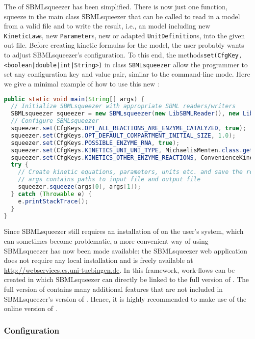 The \API of SBMLsqueezer has been simplified.
There is now just one function, squeeze in the main class SBMLsqueezer that can
be called to read in a model from a valid \SBML file and to write the result,
i.e., an \SBML model including new \texttt{KineticLaw}s, new \texttt{Parameter}s, new or adapted
\texttt{UnitDefinition}s, into the given out file. Before creating kinetic formulas for
the model, the user probably wants to adjust SBMLsqueezer's configuration.
To this end, the methods\texttt{set(CfgKey, <boolean|double|int|String>)} in class
\texttt{SBMLsqueezer} allow the programmer to set any configuration key and value pair,
similar to the command-line mode. Here we give a minimal example of how to use
this new \API:
\begin{lstlisting}[language=Java, caption={Usage of SBMLsqueezer 1.3 via its \acs{API}}, label={lst:1.3APIUsage}]
public static void main(String[] args) {
  // Initialize SBMLsqueezer with appropriate SBML readers/writers
  SBMLsqueezer squeezer = new SBMLsqueezer(new LibSBMLReader(), new LibSBMLWriter());
  // Configure SBMLsqueezer
  squeezer.set(CfgKeys.OPT_ALL_REACTIONS_ARE_ENZYME_CATALYZED, true);
  squeezer.set(CfgKeys.OPT_DEFAULT_COMPARTMENT_INITIAL_SIZE, 1.0);
  squeezer.set(CfgKeys.POSSIBLE_ENZYME_RNA, true);
  squeezer.set(CfgKeys.KINETICS_UNI_UNI_TYPE, MichaelisMenten.class.getName());
  squeezer.set(CfgKeys.KINETICS_OTHER_ENZYME_REACTIONS, ConvenienceKinetics.class.getName());
  try {
    // Create kinetic equations, parameters, units etc. and save the result
    // args contains paths to input file and output file
    squeezer.squeeze(args[0], args[1]);
  } catch (Throwable e) {
    e.printStackTrace();
  }
}
\end{lstlisting}
Since SBMLsqueezer still requires an installation of \libSBML on the user's
system, which can sometimes become problematic, a more convenient way of using
SBMLsqueezer has now been made available: the SBMLsqueezer web application does
not require any local installation and is freely available at
\url{http://webservices.cs.uni-tuebingen.de}. In this framework, work-flows can
be created in which SBMLsqueezer can directly be linked to the full version of
\SBMLLaTeX. The full version of \SBMLLaTeX contains many additional features
that are not included in SBMLsqueezer's version of \SBMLLaTeX. Hence, it is
highly recommended to make use of the online version of \SBMLLaTeX.


\subsubsection{Configuration}

